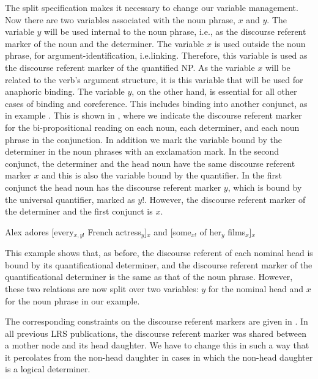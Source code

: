 \documentclass[output=paper]{langsci/langscibook}
\begin{document}
The split specification makes it necessary to change our variable management. 
Now there are two variables associated with the noun phrase, $x$ and $y$. The variable $y$ will be used internal to the noun phrase, i.e., as the discourse referent marker of the noun and the determiner. The variable $x$ is used outside the noun phrase, for argument-identification, i.e.\@ linking. Therefore, this variable is used as the discourse referent marker of the quantified NP. As the variable $x$ will be related to the verb's argument structure, it is this variable that will be used for anaphoric binding. 
The variable $y$, on the other hand, is essential for all other cases of binding and coreference.
This includes binding into another conjunct, as in example . 
This is shown in , where we indicate the discourse referent marker for the bi-propositional reading on each noun,  each determiner, and each noun phrase in the conjunction. 
In addition we mark the variable bound by the determiner in the noun phrases with an exclamation mark.
In the second conjunct, the determiner  and the head noun 
have the same discourse referent marker $x$ and this is also the variable bound by the quantifier. 
In the first conjunct the head noun has the discourse referent marker $y$, which is bound by the universal quantifier, marked as $y!$. However, the discourse referent marker of the determiner and the first conjunct is $x$.


\ea \label{split-actress-dr}
Alex adores [every$_{x,y!}$ French actress$_y$]$_x$ and [some$_{x!}$ of her$_y$ films$_x$]$_x$
\z 

This example shows that, as before, the discourse referent of each nominal head is bound by its quantificational determiner, and the discourse referent mark\-er of the quantificational determiner is the same as that of the noun phrase.  However, these two relations are now split over two variables: $y$ for the nominal head and $x$ for the noun phrase  in our example.

The corresponding constraints on the discourse referent markers are given in . 
In all previous LRS publications, the discourse referent marker was shared between a mother node and its head daughter. We have to change this in such a way that it percolates from the non-head daughter in cases in which the non-head daughter is a logical determiner.


\ea \label{dr-princ}
\begin{xlist}
\end{xlist}
\z 
\end{document}
